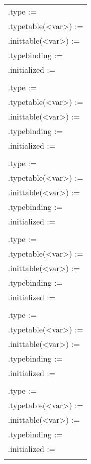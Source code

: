 \documentclass{article}
\begin{document}
\begin{enumerate}
\begin{longtable}[t]{P{1}}
.type := \\
.typetable(<var>) := \\
.inittable(<var>) := \\
.typebinding := \\
.initialized := \\\\

.type := \\
.typetable(<var>) := \\
.inittable(<var>) := \\
.typebinding := \\
.initialized := \\\\

.type := \\
.typetable(<var>) := \\
.inittable(<var>) := \\
.typebinding := \\
.initialized := \\\\

.type := \\
.typetable(<var>) := \\
.inittable(<var>) := \\
.typebinding := \\
.initialized := \\\\

.type := \\
.typetable(<var>) := \\
.inittable(<var>) := \\
.typebinding := \\
.initialized := \\\\

.type := \\
.typetable(<var>) := \\
.inittable(<var>) := \\
.typebinding := \\
.initialized := \\\\


\end{longtable}
\end{enumerate}
\end{document}
